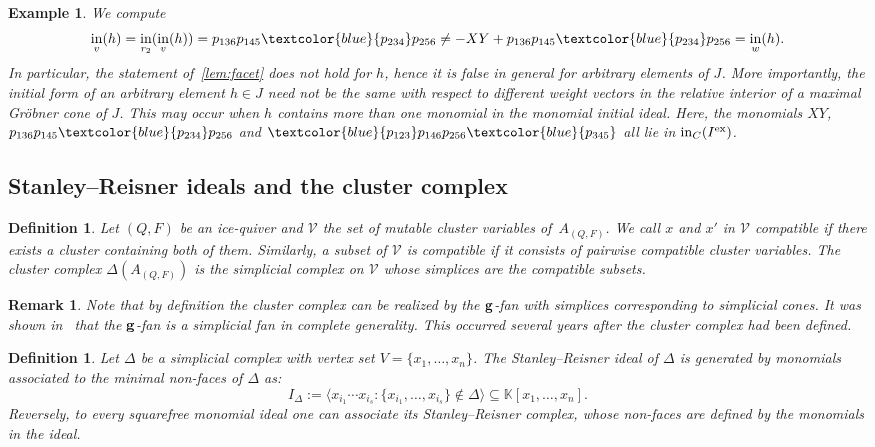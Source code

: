 \documentclass[10pt,a4paper]{amsart}
\newcommand{\thlabel}[1]{\label{#1}}
\newcommand{\thref}[1]{\ref{#1}}
\newtheorem{Definition}[Theorem]{Definition}
\newtheorem{Example}[Theorem]{Example}
\newtheorem{Remark}[Theorem]{Remark}}
\numberwithin{equation}{section}
\DeclareMathOperator{\init}{in}
\begin{document}
\begin{Example}
We compute
\begin{displaymath}
\init_{v}(h) = \init_{r_2}(\init_{v}(h)) = p_{136}p_{145}\textcolor{blue}{p_{234}}p_{256} \not = -{XY} + p_{136}p_{145}\textcolor{blue}{p_{234}}p_{256} = \init_w(h).
\end{displaymath}
In particular, the statement of~\thref{lem:facet} does not hold for $h$, hence it is false in general for arbitrary elements of $J$.
More importantly, the initial form of an arbitrary element $h\in J$ need not be the same with respect to different weight vectors in the relative interior of a maximal Gr\"obner cone of $J$.
This may occur when $h$ contains more than one monomial in the monomial initial ideal.
Here, the monomials $XY$, $p_{136}p_{145}\textcolor{blue}{p_{234}}p_{256}$ and $\textcolor{blue}{p_{123}}p_{146}p_{256}\textcolor{blue}{p_{345}}$ all lie in $\init_C(I^{\rm ex})$.
\end{Example}

\subsection{Stanley--Reisner ideals and the cluster complex}%

\begin{Definition}
Let $(Q,F)$ be an ice-quiver and $\mathcal{V}$ the set of mutable cluster variables of~$A_{(Q,F)}$.
We call $x$ and $x'$ in $\mathcal{V}$ {\it compatible} if there exists a cluster containing both of them. Similarly, a subset of $\mathcal{V}$ is compatible if it consists of pairwise compatible cluster variables. The {\it cluster complex} $\Delta(A_{(Q,F)})$ is the simplicial complex on $\mathcal{V}$ whose simplices are the compatible subsets.
\end{Definition}

\begin{Remark}
Note that by definition the cluster complex can be realized by the ${\bf g}$-fan with simplices corresponding to simplicial cones.
It was shown in~\cite{GHKK} that the ${\bf g}$-fan is a simplicial fan in complete generality.
This occurred several years after the cluster complex had been defined.
\end{Remark}



\begin{Definition}\thlabel{def:SR-ideal}
Let $\Delta$ be a simplicial complex with vertex set $V=\{x_1,\dots,x_n\}$.
The {\it Stanley--Reisner ideal} of $\Delta$ is generated by monomials associated to the minimal non-faces of $\Delta$ as:
\begin{displaymath}
I_{\Delta}:=\langle x_{i_1} \cdots x_{i_s}\colon \{x_{i_1},\dots,x_{i_s}\}\not\in \Delta\rangle \subseteq \mathbb K[x_1,\dots,x_n].
\end{displaymath}
Reversely, to every squarefree monomial ideal one can associate its {\it Stanley--Reisner complex}, whose non-faces are defined by the monomials in the ideal.
\end{Definition}
\end{document}
